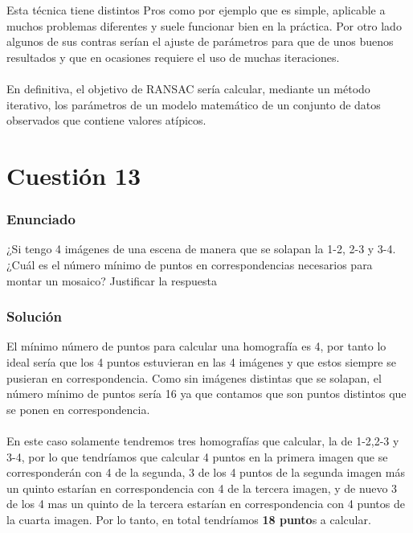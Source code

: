 Esta técnica tiene distintos Pros como por ejemplo que es simple, aplicable a muchos problemas diferentes y suele funcionar bien en la práctica. Por otro lado algunos de sus contras serían
el ajuste de parámetros para que de unos buenos resultados y que en ocasiones requiere el uso de muchas iteraciones.\\
\\
En definitiva, el objetivo de RANSAC sería calcular, mediante un método iterativo, los parámetros de un modelo matemático de un conjunto de datos observados que contiene valores atípicos.


\section{Cuestión 13}

\subsubsection{Enunciado}

¿Si tengo 4 imágenes de una escena de manera que se solapan la 1-2, 2-3 y 3-4. ¿Cuál es el número mínimo de puntos en correspondencias necesarios para montar un mosaico? Justificar la respuesta 

\subsubsection{Solución}

El mínimo número de puntos para calcular una homografía es 4, por tanto lo ideal sería que los 4 puntos estuvieran en las 4 imágenes y que estos siempre se pusieran en correspondencia. Como sin imágenes distintas que se solapan, el número mínimo de puntos sería 16 ya que contamos que son puntos distintos que se ponen en correspondencia.\\
\\
En este caso solamente tendremos tres homografías que calcular, la de 1-2,2-3 y 3-4, por lo que tendríamos que calcular 4 puntos en la primera imagen que se corresponderán con 4 de la segunda, 3 de los 4 puntos de la segunda imagen más un quinto estarían en correspondencia con 4 de la tercera imagen, y de nuevo 3 de los 4 mas un quinto de la tercera  estarían en correspondencia con 4 puntos de la cuarta imagen. Por lo tanto, en total tendríamos\textbf{ 18 punto}s a calcular.

